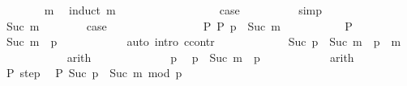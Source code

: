 \begin{isabellebody}
\ \ \ \ \isamarkupfalse%
\ {\isacartoucheopen}{}\ {\isacharless}{\kern0pt}\ m{\isacartoucheclose}\ \isamarkupfalse%
\ {\isacharparenleft}{\kern0pt}induct\ m{\isacharparenright}{\kern0pt}\isanewline
\ \ \ \ \ \ \isamarkupfalse%
\ {}\isanewline
\ \ \ \ \ \ \isamarkupfalse%
\ \isamarkupfalse%
\ {\isacharquery}{\kern0pt}case\isanewline
\ \ \ \ \ \ \ \ \isamarkupfalse%
\ simp\isanewline
\ \ \ \ \isamarkupfalse%
\isanewline
\ \ \ \ \ \ \isamarkupfalse%
\ {\isacharparenleft}{\kern0pt}Suc\ m{\isacharparenright}{\kern0pt}\isanewline
\ \ \ \ \ \ \isamarkupfalse%
\ {\isacharquery}{\kern0pt}case\isanewline
\ \ \ \ \ \ \isamarkupfalse%
\isanewline
\ \ \ \ \ \ \ \ \isamarkupfalse%
\ P{\isacharcolon}{\kern0pt}\ {\isachardoublequoteopen}P\ {\isacharparenleft}{\kern0pt}p\ {\isacharminus}{\kern0pt}\ Suc\ m{\isacharparenright}{\kern0pt}{\isachardoublequoteclose}\isanewline
\ \ \ \ \ \ \ \ \isamarkupfalse%
\ {\isacartoucheopen}{\isasymnot}\ P\ {}{\isacartoucheclose}\ \isamarkupfalse%
\ {\isachardoublequoteopen}Suc\ m\ {\isacharless}{\kern0pt}\ p{\isachardoublequoteclose}\isanewline
\ \ \ \ \ \ \ \ \ \ \isamarkupfalse%
\ {\isacharparenleft}{\kern0pt}auto\ intro{\isacharcolon}{\kern0pt}\ ccontr{\isacharparenright}{\kern0pt}\ \isanewline
\ \ \ \ \ \ \ \ \isamarkupfalse%
\ \isamarkupfalse%
\ {\isachardoublequoteopen}Suc\ {\isacharparenleft}{\kern0pt}p\ {\isacharminus}{\kern0pt}\ Suc\ m{\isacharparenright}{\kern0pt}\ {\isacharequal}{\kern0pt}\ p\ {\isacharminus}{\kern0pt}\ m{\isachardoublequoteclose}\isanewline
\ \ \ \ \ \ \ \ \ \ \isamarkupfalse%
\ arith\isanewline
\ \ \ \ \ \ \ \ \isamarkupfalse%
\ \isamarkupfalse%
\ {\isacartoucheopen}{}\ {\isacharless}{\kern0pt}\ p{\isacartoucheclose}\ \isamarkupfalse%
\ {\isachardoublequoteopen}p\ {\isacharminus}{\kern0pt}\ Suc\ m\ {\isacharless}{\kern0pt}\ p{\isachardoublequoteclose}\isanewline
\ \ \ \ \ \ \ \ \ \ \isamarkupfalse%
\ arith\isanewline
\ \ \ \ \ \ \ \ \isamarkupfalse%
\ P\ step\ \isamarkupfalse%
\ {\isachardoublequoteopen}P\ {\isacharparenleft}{\kern0pt}{\isacharparenleft}{\kern0pt}Suc\ {\isacharparenleft}{\kern0pt}p\ {\isacharminus}{\kern0pt}\ Suc\ m{\isacharparenright}{\kern0pt}{\isacharparenright}{\kern0pt}\ mod\ p{\isacharparenright}{\kern0pt}{\isachardoublequoteclose}\isanewline

\end{isabellebody}
